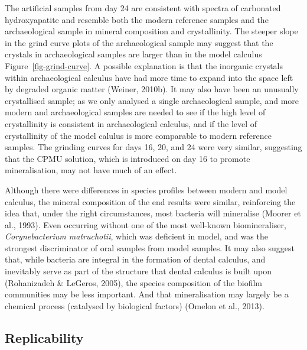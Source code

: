 \documentclass[
]{article}
\begin{document}
The artificial samples from day 24 are consistent with spectra of
carbonated hydroxyapatite and resemble both the modern reference samples
and the archaeological sample in mineral composition and crystallinity.
The steeper slope in the grind curve plots of the archaeological sample
may suggest that the crystals in archaeological samples are larger than
in the model calculus Figure~\ref{fig-grind-curve}. A possible
explanation is that the inorganic crystals within archaeological
calculus have had more time to expand into the space left by degraded
organic matter (Weiner, 2010b). It may also have been an unusually
crystallised sample; as we only analysed a single archaeological sample,
and more modern and archaeological samples are needed to see if the high
level of crystallinity is consistent in archaeological calculus, and if
the level of crystallinity of the model calulus is more comparable to
modern reference samples. The grinding curves for days 16, 20, and 24
were very similar, suggesting that the CPMU solution, which is
introduced on day 16 to promote mineralisation, may not have much of an
effect.

Although there were differences in species profiles between modern and
model calculus, the mineral composition of the end results were similar,
reinforcing the idea that, under the right circumstances, most bacteria
will mineralise (Moorer et al., 1993). Even occurring without one of the
most well-known biomineraliser, \emph{Corynebacterium matruchotii},
which was deficient in model, and was the strongest discriminator of
oral samples from model samples. It may also suggest that, while
bacteria are integral in the formation of dental calculus, and
inevitably serve as part of the structure that dental calculus is built
upon (Rohanizadeh \& LeGeros, 2005), the species composition of the
biofilm communities may be less important. And that mineralisation may
largely be a chemical process (catalysed by biological factors) (Omelon
et al., 2013).

\hypertarget{replicability}{%
\subsection{Replicability}\label{replicability}}
\end{document}
